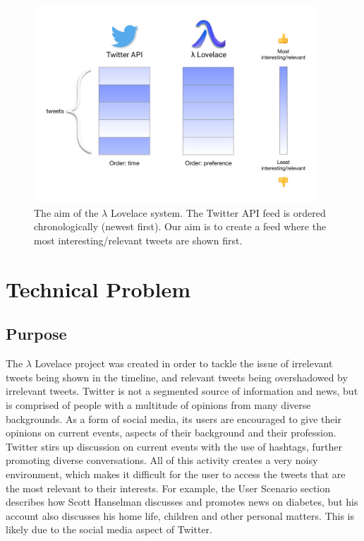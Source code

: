 \documentclass{article}
\begin{document}
\begin{figure}[H]
    \centering
    \includegraphics[width=0.95\textwidth]{explaining}
    \caption{The aim of the $\lambda$ Lovelace system. The Twitter API feed is ordered chronologically (newest first). Our aim is to create a feed where the most interesting/relevant tweets are shown first.}
\end{figure}


\newpage


\section{Technical Problem} %

\subsection{Purpose} %
The $\lambda$ Lovelace project was created in order to tackle the issue of irrelevant tweets being shown in the timeline, and relevant tweets being overshadowed by irrelevant tweets. Twitter is not a segmented source of information and news, but is comprised of people with a multitude of opinions from many diverse backgrounds. As a form of social media, its users are encouraged to give their opinions on current events, aspects of their background and their profession. Twitter stirs up discussion on current events with the use of hashtags, further promoting diverse conversations. All of this activity creates a very noisy environment, which makes it difficult for the user to access the tweets that are the most relevant to their interests. For example, the User Scenario section describes how Scott Hanselman discusses and promotes news on diabetes, but his account also discusses his home life, children and other personal matters. This is likely due to the social media aspect of Twitter. 
\end{document}
